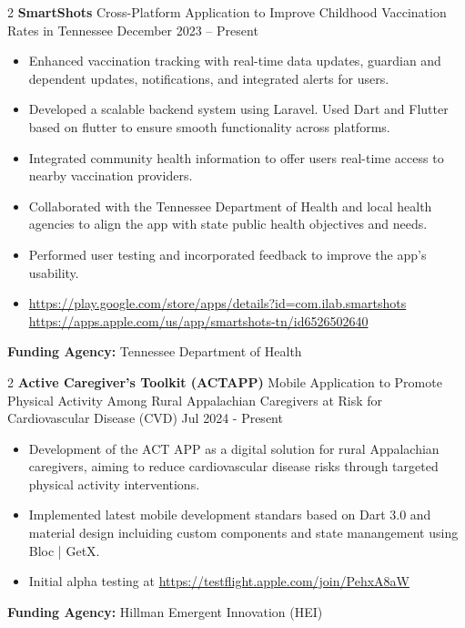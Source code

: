 \documentclass[10pt, letterpaper]{article}
\newenvironment{highlights}{
    \begin{itemize}[
        topsep=0.10 cm,
        parsep=0.10 cm,
        partopsep=0pt,
        itemsep=0pt,
        leftmargin=0 cm + 10pt
    ]
}{
    \end{itemize}
} %
\newenvironment{twocolentry}[2][]{
    \onecolentry
    \def\secondColumn{#2}
    \setcolumnwidth{\fill, 4.5 cm}
    \begin{paracol}{2}
}{
    \switchcolumn \raggedleft \secondColumn
    \end{paracol}
    \endonecolentry
} %
\begin{document}
            \vspace{0.3cm} \begin{twocolentry}{December 2023 – Present} \textbf{SmartShots} \textbar Cross-Platform Application to Improve Childhood Vaccination Rates in Tennessee \end{twocolentry} \begin{highlights} 
                \item Enhanced vaccination tracking with real-time data updates, guardian and dependent updates, notifications, and integrated alerts for users. 
                \item Developed a scalable backend system using Laravel. Used Dart and Flutter based on flutter to ensure smooth functionality across platforms. 
                \item Integrated community health information to offer users real-time access to nearby vaccination providers.
                 \item Collaborated with the Tennessee Department of Health and local health agencies to align the app with state public health objectives and needs. 
                 \item Performed user testing and incorporated feedback to improve the app’s usability. 
                 \item \url{https://play.google.com/store/apps/details?id=com.ilab.smartshots} \url{https://apps.apple.com/us/app/smartshots-tn/id6526502640} \end{highlights} \vspace{0.3cm} \noindent \textbf{Funding Agency:} Tennessee Department of Health
        
        \vspace{0.3cm} \begin{twocolentry}{Jul 2024 - Present} \textbf{Active Caregiver’s Toolkit (ACTAPP)} \textbar Mobile Application to Promote Physical Activity Among Rural Appalachian Caregivers at Risk for Cardiovascular Disease (CVD) \end{twocolentry} \begin{highlights} 
            \item Development of the ACT APP as a digital solution for rural Appalachian caregivers, aiming to reduce cardiovascular disease risks through targeted physical activity interventions. 
            \item Implemented latest mobile development standars based on Dart 3.0 and material design incluiding custom components and state manangement using Bloc | GetX.
            \item Initial alpha testing at \url{https://testflight.apple.com/join/PehxA8aW}
        \end{highlights} \vspace{0.3cm} \noindent \textbf{Funding Agency:} Hillman Emergent Innovation (HEI)
    
\end{document}
